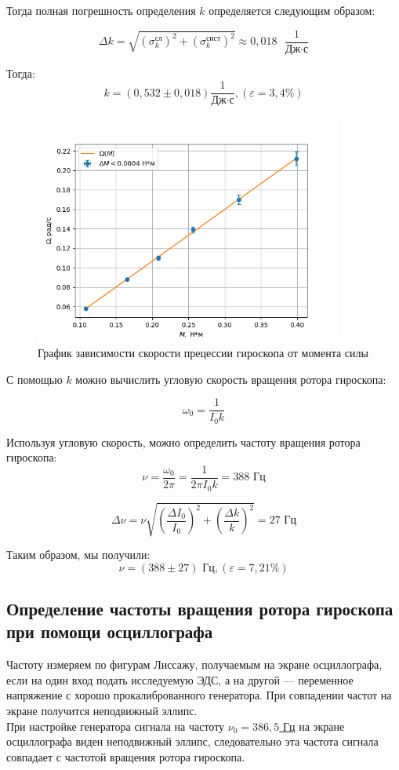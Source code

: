 \documentclass[a4paper,12pt]{article}
\begin{document}
    Тогда полная погрешность определения $ k $ определяется следующим образом:

	$$\Delta k = \sqrt{\left( \sigma_k^\text{сл} \right)^2 + \left( \sigma_k^\text{сист} \right)^2  } \approx 0,018 \text{ } \frac{1}{\text{Дж} \cdot \text{с}}$$

    Тогда:
    $$k =\left( 0,532 \pm 0,018 \right) \frac{1}{\text{Дж} \cdot \text{с}} , \left( \varepsilon = 3,4 \% \right)$$

\begin{figure}[H]
    \centering
    \includegraphics[width=0.9\textwidth]{graph.png}
    \caption{График зависимости скорости прецессии гироскопа от момента силы}
\end{figure}

    С помощью $ k $ можно вычислить угловую скорость вращения ротора гироскопа:
	
	$$\omega_0 = \frac{1}{I_0 k}$$

	Используя угловую скорость, можно определить частоту вращения ротора гироскопа:
	$$\nu = \frac{\omega_0}{2\pi} = \frac{1}{2\pi I_0 k } = 388 \text{ Гц}$$
	
    $$\Delta \nu = \nu \sqrt{\left( \frac{\Delta {I_0}}{I_0} \right)^2 + \left( \frac{\Delta k}{k} \right)^2} = 27 \text{ Гц}$$
   
	
	Таким образом, мы получили:
		 $$ \nu = \left( 388 \pm 27 \right) \text{ Гц}, \left( \varepsilon = 7,21 \% \right)   $$


\subsection*{Определение частоты вращения ротора гироскопа при помощи осциллографа}
Частоту измеряем по фигурам Лиссажу, получаемым на экране осциллографа, если на один вход подать исследуемую ЭДС, а на другой — переменное напряжение с хорошо прокалиброванного генератора. При совпадении частот на экране получится неподвижный эллипс.\\
	При настройке генератора сигнала на частоту \underline{$ \nu_0 = 386,5$ Гц} на экране осциллографа виден  неподвижный эллипс, следовательно эта частота сигнала совпадает с частотой вращения ротора гироскопа.
\end{document}

